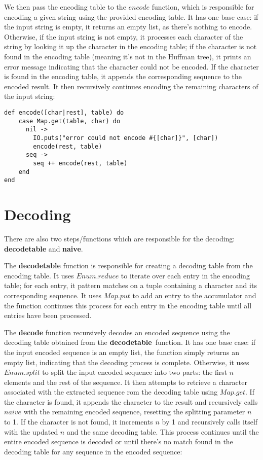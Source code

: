 \documentclass[a4paper,11pt]{article}
\begin{document}
We then pass the encoding table to the $encode$ function, which is responsible for encoding a given string using the provided encoding table. It has one base case: if the input string is empty, it returns an empty list, as there's nothing to encode. Otherwise, if the input string is not empty, it processes each character of the string by looking it up the character in the encoding table; if the character is not found in the encoding table (meaning it's not in the Huffman tree), it prints an error message indicating that the character could not be encoded. If the character is found in the encoding table, it appends the corresponding sequence to the encoded result. It then recursively continues encoding the remaining characters of the input string:
\begin{verbatim}
def encode([char|rest], table) do
    case Map.get(table, char) do
      nil ->
        IO.puts("error could not encode #{[char]}", [char])
        encode(rest, table)
      seq -> 
        seq ++ encode(rest, table)
    end
end
\end{verbatim}



\section*{Decoding}
There are also two steps/functions which are responsible for the decoding: \textbf{decodetable} and \textbf{naive}.

The \textbf{decodetable} function is responsible for creating a decoding table from the encoding table. It uses $Enum.reduce$ to iterate over each entry in the encoding table; for each entry, it pattern matches on a tuple containing a character and its corresponding sequence. It uses $Map.put$ to add an entry to the accumulator and the function continues this process for each entry in the encoding table until all entries have been processed.

The \textbf{decode} function recursively decodes an encoded sequence using the decoding table obtained from the \textbf{decodetable} function. It has one base case: if the input encoded sequence is an empty list, the function simply returns an empty list, indicating that the decoding process is complete. Otherwise, it uses $Enum.split$ to split the input encoded sequence into two parts: the first $n$ elements and the rest of the sequence. It then attempts to retrieve a character associated with the extracted sequence rom the decoding table using $Map.get$. If the character is found, it appends the character to the result and recursively calls $naive$ with the remaining encoded sequence, resetting the splitting parameter $n$ to 1. If the character is not found, it increments $n$ by 1 and recursively calls itself with the updated $n$ and the same decoding table. This process continues until the entire encoded sequence is decoded or until there's no match found in the decoding table for any sequence in the encoded sequence:
\end{document}
